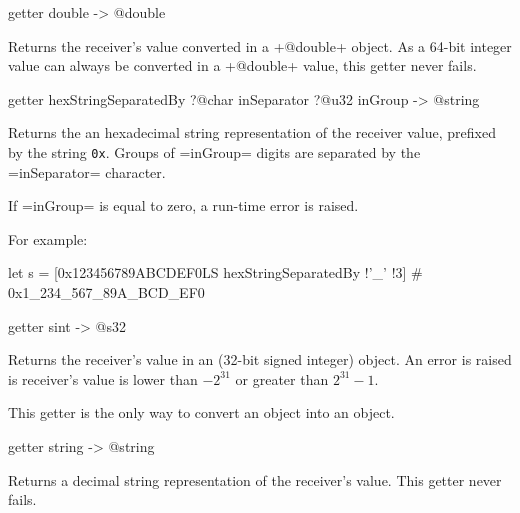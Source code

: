 \begin{galgas4}
getter double -> @double
\end{galgas4}

Returns the receiver's value converted in a \ggsq+@double+ object. As a 64-bit integer value can always be converted in a \ggsq+@double+ value, this getter never fails.




\begin{galgas4}
getter hexStringSeparatedBy ?@char inSeparator ?@u32 inGroup -> @string
\end{galgas4}

Returns the an hexadecimal string representation of the receiver value, prefixed by the string \texttt{0x}. Groups of \ggsq=inGroup= digits are separated by the \ggsq=inSeparator= character.

If \ggsq=inGroup= is equal to zero, a run-time error is raised.

For example:
\begin{galgas4}
let s = [0x123456789ABCDEF0LS hexStringSeparatedBy !'_' !3] # 0x1_234_567_89A_BCD_EF0
\end{galgas4}





\begin{galgas4}
getter sint -> @s32
\end{galgas4}

Returns the receiver's value in an  (32-bit signed integer) object. An error is raised is receiver's value is lower than $-2^{31}$ or greater than $2^{31}-1$.

This getter is the only way to convert an  object into an  object.






\begin{galgas4}
getter string -> @string
\end{galgas4}

Returns a decimal string representation of the receiver's value. This getter never fails.









